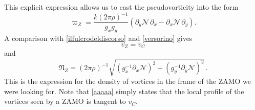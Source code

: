 \documentclass[usenatbib%
]{mnras}
\begin{document}
This explicit expression allows us to cast the  pseudovorticity   into the form 
\begin{equation}\label{oraepersempre}
\varpi_Z = \dfrac{k (2\pi\rho)^{-1}}{ g_x g_y} 
(\partial_y \mathcal{N} \, \partial_x - \partial_x \mathcal{N} \, \partial_y).
\end{equation}
A comparison with \eqref{ilfulcrodeldiscorso} and \eqref{versorino} gives
\begin{equation}\label{aaaaa}
v_Z = v_C
\end{equation}
and
\begin{equation}\label{zzzzz}
\mathfrak{N}_Z 
= 
 (2\pi \rho )^{-1} {\sqrt{ (g_x^{-1}\partial_x \mathcal{N})^2 +(g_y^{-1}\partial_y \mathcal{N})^2} } \, .
\end{equation}
This is the expression for the density of vortices in the frame of the ZAMO we were looking for. Note that \eqref{aaaaa} simply states that the local profile of the vortices seen by a ZAMO is tangent to $v_C$. 
\end{document}
